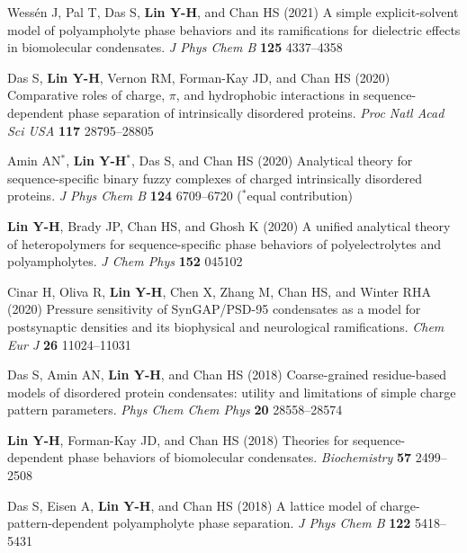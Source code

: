 \documentclass[11pt]{../yhlcv}
\def\tname#1{{\bf #1}}
\begin{document}
\begin{etaremune}[leftmargin=0.26in]\itemsep-0.2pt

\item 
Wessén J, Pal T, Das S, \tname{Lin Y-H}, and Chan HS (2021)
A simple explicit-solvent model of polyampholyte phase behaviors and its ramifications for dielectric effects in biomolecular condensates.
{\it J Phys Chem B} {\bf 125} 4337--4358 %

\item 
Das S, \tname{Lin Y-H}, Vernon RM, Forman-Kay JD, and Chan HS (2020)
Comparative roles of charge, $\pi$, and hydrophobic interactions in sequence-dependent phase separation of intrinsically disordered proteins.
{\it Proc Natl Acad Sci USA} {\bf 117} 28795--28805

\item 
Amin AN$^*$, \tname{Lin Y-H}$^*$, Das S, and Chan HS (2020)
Analytical theory for sequence-specific binary fuzzy complexes of charged intrinsically disordered proteins.
{\it J Phys Chem B} 
{\bf 124} 6709--6720
($^*$equal contribution) %

\item
\tname{Lin Y-H}, Brady JP, Chan HS, and Ghosh K (2020)
A unified analytical theory of heteropolymers for sequence-specific phase behaviors of polyelectrolytes and polyampholytes. 
{\it J Chem Phys} {\bf 152} 045102

\item
Cinar H, Oliva R, \tname{Lin Y-H}, Chen X, Zhang M, Chan HS, and Winter RHA (2020)
Pressure sensitivity of SynGAP/PSD-95 condensates as a model for postsynaptic densities and its biophysical and neurological ramifications. 
{\it Chem Eur J} {\bf 26} 11024--11031 %

\item 
Das S, Amin AN, \tname{Lin Y-H}, and Chan HS (2018)
Coarse-grained residue-based models of disordered protein condensates: 
utility and limitations of simple charge pattern parameters.
{\it Phys Chem Chem Phys} {\bf 20} 28558--28574 

\item
\tname{Lin Y-H}, Forman-Kay JD, and Chan HS (2018)
Theories for sequence-dependent phase behaviors of biomolecular condensates.
{\it Biochemistry} {\bf 57} 2499--2508

\item 
Das S, Eisen A, \tname{Lin Y-H}, and Chan HS (2018)
A lattice model of charge-pattern-dependent polyampholyte phase separation.
{\it J Phys Chem B} {\bf 122} 5418--5431


\end{etaremune}
\end{document}
